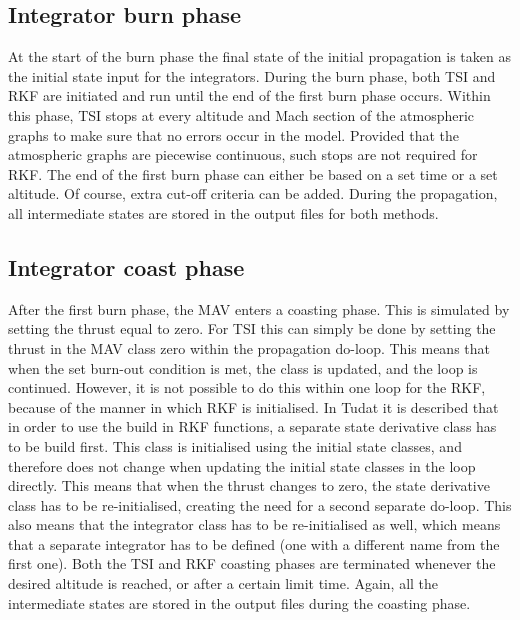 \subsection{Integrator burn phase}
\label{subsec:integratorBurnPhase}
At the start of the burn phase the final state of the initial propagation is taken as the initial state input for the integrators. During the burn phase, both \ac{TSI} and \ac{RKF} are initiated and run until the end of the first burn phase occurs. Within this phase, \ac{TSI} stops at every altitude and Mach section of the atmospheric graphs to make sure that no errors occur in the model. Provided that the atmospheric graphs are piecewise continuous, such stops are not required for \ac{RKF}. The end of the first burn phase can either be based on a set time or a set altitude. Of course, extra cut-off criteria can be added. During the propagation, all intermediate states are stored in the output files for both methods.


\subsection{Integrator coast phase}
\label{subsec:integratorCoastPhase}
After the first burn phase, the \ac{MAV} enters a coasting phase. This is simulated by setting the thrust equal to zero. For \ac{TSI} this can simply be done by setting the thrust in the \ac{MAV} class zero within the propagation do-loop. This means that when the set burn-out condition is met, the class is updated, and the loop is continued. However, it is not possible to do this within one loop for the \ac{RKF}, because of the manner in which \ac{RKF} is initialised. In \ac{Tudat} it is described that in order to use the build in \ac{RKF} functions, a separate state derivative class has to be build first. This class is initialised using the initial state classes, and therefore does not change when updating the initial state classes in the loop directly. This means that when the thrust changes to zero, the state derivative class has to be re-initialised, creating the need for a second separate do-loop. This also means that the integrator class has to be re-initialised as well, which means that a separate integrator has to be defined (one with a different name from the first one). Both the \ac{TSI} and \ac{RKF} coasting phases are terminated whenever the desired altitude is reached, or after a certain limit time. Again, all the intermediate states are stored in the output files during the coasting phase.


